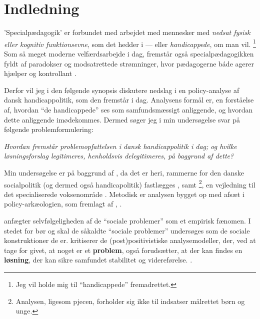 \section{Indledning}

'Specialpædagogik' er forbundet med arbejdet med mennesker med \textit{nedsat fysisk eller kognitiv funktionsevne}, som det hedder i  — eller \textit{handicappede}, om man vil. \footnote{Jeg vil holde mig til “handicappede” fremadrettet.}
Som så meget moderne velfærdsarbejde i dag, fremstår også specialpædagogikken fyldt af paradokser og modsatrettede strømninger, hvor pædagogerne báde agerer hjælper og kontrollant \autocite{mik-meyerIndledningSkabeProfessionel2012}. 

Derfor vil jeg i den følgende synopsis diskutere nedslag i en policy-analyse af dansk handicappolitik, som den fremstår i dag.
Analysens formål er, en forståelse af, hvordan “de handicappede” ses som samfundsmæssigt anliggende, og hvordan dette anliggende imødekommes.
Dermed søger jeg i min undersøgelse svar på følgende problemformulering:
\begin{center}
  \textit{Hvordan fremstår problemopfattelsen i dansk handicappolitik i dag; og hvilke løsningsforslag legitimeres, henholdsvis delegitimeres, på baggrund af dette?}
\end{center}
Min undersøgelse er på baggrund af , da det er heri, rammerne for den danske socialpolitik (og dermed også handicapolitik) fastlægges \autocite[kapitel 2]{social-ogindenrigsministerietBekendtgorelseAfLov2019}, samt \footnote{Analysen, ligesom pjecen, forholder sig ikke til indsatser målrettet børn og unge.}, en vejledning til det specialiserede voksenområde \autocite{klStyringAfDet2017}.
Metodisk er analysen bygget op med afsæt i policy-arkæologien, som fremlagt af \citeauthor{scheurichPolicyArchaeologyNew1994}, \citeyear{scheurichPolicyArchaeologyNew1994}.

\citeauthor{scheurichPolicyArchaeologyNew1994} anfægter selvfølgeligheden af de “sociale problemer” som et empirisk fænomen.
I stedet for bør og skal de såkaldte “sociale problemer” undersøges som de sociale konstruktioner de er.
\citeauthor{scheurichPolicyArchaeologyNew1994} kritiserer de (post)positivistiske analysemodeller, der, ved at tage for givet, at noget er et \textbf{problem}, også forudsætter, at der kan findes en \textbf{løsning}, der kan sikre samfundet stabilitet og videreførelse. \autocite[ss. 298-299]{scheurichPolicyArchaeologyNew1994}.



